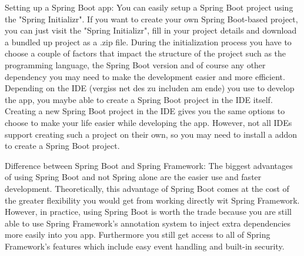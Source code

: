    Setting up a Spring Boot app:
    You can easily setup a Spring Boot project using the "Spring Initializr". If you want to create your own Spring Boot-based project, you can just visit the "Spring Initializr", fill in your project details and download a bundled up project as a .zip file. During the initialization process you have to choose a couple of factors that impact the structure of the 
    project such as the programming language, the Spring Boot version and of course any other dependency you may need to make the development easier and more efficient.
    Depending on the IDE (vergiss net des zu includen am ende) you use to develop the app, you maybe able to create a Spring Boot project in the IDE itself. Creating a new Spring Boot project in the IDE gives you the same options to choose to make your life easier while developing the app. However, not all IDEs support creating such a project
    on their own, so you may need to install a addon to create a Spring Boot project.
    
    Difference between Spring Boot and Spring Framework:
    The biggest advantages of using Spring Boot and not Spring alone are the easier use and faster development. Theoretically, this advantage of Spring Boot comes at the cost of the greater flexibility you would get from working directly wit Spring Framework. However, in practice, using Spring Boot is worth the trade because you are still able to use
    Spring Framework's annotation system to inject extra dependencies more easily into you app. Furthermore you still get access to all of Spring Framework's features which include easy event handling and built-in security. 
    
